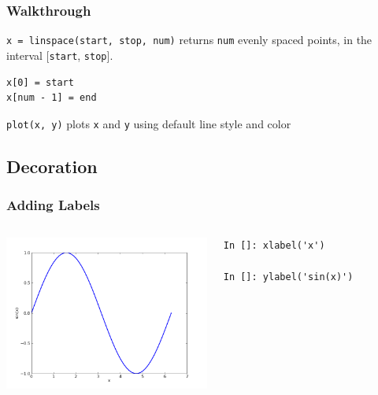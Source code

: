 \documentclass[14pt,compress]{beamer}
\newcounter{time}
\newcommand{\inctime}[1]{\addtocounter{time}{#1}{\tiny \thetime\ m}}
\newcommand{\typ}[1]{\lstinline{#1}}
\begin{document}
\begin{frame}[fragile]
\frametitle{Walkthrough}
\begin{block}{\typ{x = linspace(start, stop, num)} }
returns \typ{num} evenly spaced points, in the interval [\typ{start}, \typ{stop}].
\end{block}
\begin{lstlisting}
x[0] = start
x[num - 1] = end
\end{lstlisting}
\vspace*{.35in}
\begin{block}{\typ{plot(x, y)}}
plots \typ{x} and \typ{y} using default line style and color
\end{block}
\end{frame}

\subsection{Decoration}
\begin{frame}[fragile]
\frametitle{Adding Labels}
\begin{columns}
  \hspace*{-0.45in}
  \includegraphics[height=2in, interpolate=true]{data/label}  
  \hspace*{0.5in}
  \begin{block}{}
  \small
  \begin{lstlisting}
In []: xlabel('x')

In []: ylabel('sin(x)')
  \end{lstlisting}
  \small

  \end{block}
\end{columns}
\end{frame}
\end{document}
